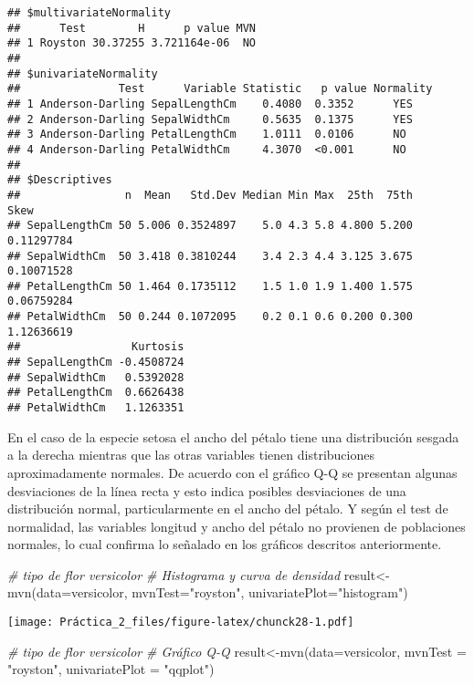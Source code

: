 \documentclass[
]{article}
\newenvironment{Shaded}{\begin{snugshade}}{\end{snugshade}}
\newcommand{\AttributeTok}[1]{\textcolor[rgb]{0.77,0.63,0.00}{#1}}
\newcommand{\CommentTok}[1]{\textcolor[rgb]{0.56,0.35,0.01}{\textit{#1}}}
\newcommand{\FunctionTok}[1]{\textcolor[rgb]{0.00,0.00,0.00}{#1}}
\newcommand{\NormalTok}[1]{#1}
\newcommand{\OtherTok}[1]{\textcolor[rgb]{0.56,0.35,0.01}{#1}}
\newcommand{\StringTok}[1]{\textcolor[rgb]{0.31,0.60,0.02}{#1}}
\begin{document}
\begin{verbatim}
## $multivariateNormality
##      Test        H      p value MVN
## 1 Royston 30.37255 3.721164e-06  NO
## 
## $univariateNormality
##               Test      Variable Statistic   p value Normality
## 1 Anderson-Darling SepalLengthCm    0.4080  0.3352      YES   
## 2 Anderson-Darling SepalWidthCm     0.5635  0.1375      YES   
## 3 Anderson-Darling PetalLengthCm    1.0111  0.0106      NO    
## 4 Anderson-Darling PetalWidthCm     4.3070  <0.001      NO    
## 
## $Descriptives
##                n  Mean   Std.Dev Median Min Max  25th  75th       Skew
## SepalLengthCm 50 5.006 0.3524897    5.0 4.3 5.8 4.800 5.200 0.11297784
## SepalWidthCm  50 3.418 0.3810244    3.4 2.3 4.4 3.125 3.675 0.10071528
## PetalLengthCm 50 1.464 0.1735112    1.5 1.0 1.9 1.400 1.575 0.06759284
## PetalWidthCm  50 0.244 0.1072095    0.2 0.1 0.6 0.200 0.300 1.12636619
##                 Kurtosis
## SepalLengthCm -0.4508724
## SepalWidthCm   0.5392028
## PetalLengthCm  0.6626438
## PetalWidthCm   1.1263351
\end{verbatim}

En el caso de la especie setosa el ancho del pétalo tiene una
distribución sesgada a la derecha mientras que las otras variables
tienen distribuciones aproximadamente normales. De acuerdo con el
gráfico Q-Q se presentan algunas desviaciones de la línea recta y esto
indica posibles desviaciones de una distribución normal, particularmente
en el ancho del pétalo. Y según el test de normalidad, las variables
longitud y ancho del pétalo no provienen de poblaciones normales, lo
cual confirma lo señalado en los gráficos descritos anteriormente.

\begin{Shaded}
\begin{Highlighting}[]
\CommentTok{\# tipo de flor versicolor}
\CommentTok{\# Histograma y curva de densidad}
\NormalTok{result}\OtherTok{\textless{}{-}} \FunctionTok{mvn}\NormalTok{(}\AttributeTok{data=}\NormalTok{versicolor, }\AttributeTok{mvnTest=}\StringTok{"royston"}\NormalTok{, }\AttributeTok{univariatePlot=}\StringTok{"histogram"}\NormalTok{)}
\end{Highlighting}
\end{Shaded}

\texttt{[image: Práctica\_2\_files/figure-latex/chunck28-1.pdf]}

\begin{Shaded}
\begin{Highlighting}[]
\CommentTok{\# tipo de flor versicolor}
\CommentTok{\# Gráfico Q{-}Q}
\NormalTok{result}\OtherTok{\textless{}{-}}\FunctionTok{mvn}\NormalTok{(}\AttributeTok{data=}\NormalTok{versicolor, }\AttributeTok{mvnTest =} \StringTok{"royston"}\NormalTok{, }\AttributeTok{univariatePlot =} \StringTok{"qqplot"}\NormalTok{)}
\end{Highlighting}
\end{Shaded}
\end{document}
